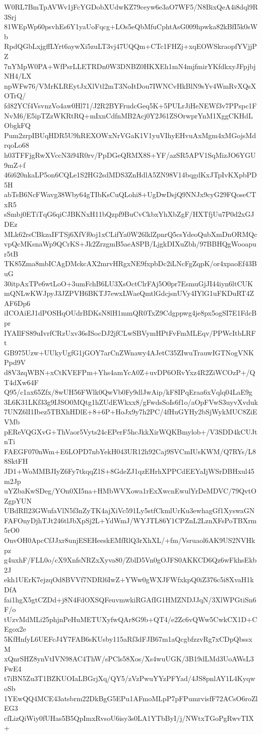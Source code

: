 W0RL7BmTpAVWv1jFcYGDobXUdwKZ79ceyw6e3aO7WF5/N8BixQeA4i8dql9R3Srj
81WEpWp60psvhEs6Y1yaUoFqcg+LOs5eQbMfuCphtAsG009hpwka82kBfI5k0sWb
RpdQGbLxjgffLYrt6aywXi5zuLT3vj47UQQm+CTc1FHZj+xqEOWSkraopfYVjjPZ
7nYMpW0PA+WfPsrLLETRDn0W3DNBZ0HKXEh1mN4mjfmirYKfdkxyJFpjbjNH4/LX
npWFw76/VMrKLREytJxXlVtl2mT3NoItDou7IWNCvHkBlN9sYv4WmRvXQsXOTrQ/
fd82YCf4VsvnzVo4aw0Hl71/J2R2BYFrudcGeq5K+5PULrJiHeNEWf3v7PPspc1F
NvM6/E5ipTZzWKRtRQ+mIxnCdfnMB2Acj0Y2J61ZSOrwprYnM1XggCKHdLObgkFQ
Pum2zrpIBUqHDR5U9hREXOWxNrVGaK1V1yuVIhyEHvuAxMgm4xMGojsMdrqoLo68
h03TFFjgRwXVccN3i94R0rv/PpDGeQRMX8S+YF/azSR5APV1SqMizJO6YGU9mZ+f
46i620nkaLP5on6CQLe1S2HG2sdMDS3ZnHdlA5ZN98V14bqgdKxJTpIvKXpbPD5H
abTsB6NcFWavg38Wby64gTIbKsCuQLohi8+UgDwDsjQ9NNJx9cyG29FQoseCTxR5
sSmbj0ETiTqG6qiCJBKNxH11bQzpf9BuCvCkbxYhXbZgF/HXTfjUu7P0d2xGJDEz
MLk62rsCBkzaIFTSj6XfVf0oj1xCLifYa0W26lklZpnrQ5csYdeoQubXmDnORMQc
vpQcMKsnaWp9QCrKS+Jk2ZrzgmB5aeASPB/LjgkDIXuZbh/97BBHQgWooapur5tB
TK85Zma8mbICAgDMckcAX2mrvHRgxNE9fxpbDc2iLNcFgZqpK/or4xpaoEf43BuG
30itpAxTPe6wtLoO+3umFchB6LU3XsOctClrFAj5O0pr7EsmuGjJI44iyn6ltCUK
mQNLwKWJpyJ3JZPVH6BKTJ7ewxLWaeQmtlGdcjsnUVy4IYlG1uFKDuRT4ZAF6Dp6
iICOAiEJ1dPOSHqOUdrBDKsN8lH1mmQR0TxZ9Cdgppwg4je8px5ogSI7E1FdcBpr
IYAIlFS89uIvrfCRzUxv36sISocDJ2jfCLwSBVymHPtFvFmMLEqv/PPWcItbLRFt
GB975Uzw+UUkyUgfG1jGOY7arCnZWnawy4AJetC35ZIwuTrauwIGTNogVNKPpd9V
d8V3zqWBN+xCtKVEFPm+Yhs4amYcA0Z+uvDP6ORvYxz4R2ZiWCOzP+/QT4dXw64F
Q95/c1ax65Zfx/8wUH56FWlk0QwVb0Fy9dlJwAip/kF8IPqEraa6xVqlq04LaE9g
3L6K31LKf33g9IJSO0MQtg1hZUdEWkxx8/gFwdsSoIs6f1o/aOpFVwS3uyvXvduk
7UNZ6lI1Ibez5TBXhHDlE+8+6P+HoJx9y7h2PC/4fHuGYHy2bSjWykMUC8ZiEVMb
pEReVQGXvG+ThVaor5Vyts24cEPerF5hcJkkXirWQKBmylob+/V3SDD4kCUJtnTi
FAEGF070nWm+E6LOPD7nbYekH043UR12h92Caj9SVCmIUsKWM/Q7RYs/L88SktFH
JD1+WoMMBJIyZ6Fy7tkqqZ1S+8GdeZJ1qzEHrhXPPCdEEYaIjWSrDBHxul45m2Jp
uYZbaKwSDeg/YOn0XI5na+HMbWVXowa1rExXwcnEwulYrDeMDVC/79QvtOZgpYUN
UBdRIl23GWufaVlN5f3nZyTK4ajXiVc591Ly5stfCkmlUrKu3ewhagGf1XyswaGN
FAFOnyDjhTJt246tlJbXpSj2L+YdWmJ/WYJTL86Y1CPZnL2LznXFsPoTBXrm5rO0
OnvOH0ApcCfJJxr8unjESEHeeskEMfRlQ3rXhXL/+fm/Vsruaol6AK9US2NVHkpz
g4uxhF/FLL0o/cX9XnfsNRZxXyva80/ZblD5Vn0gOJFS0AKKCD6Qz6wFkhsEkb2J
ekh1UErK7ejzqOd8BVVf7NDRl6IwZ+YWw0gWXJFWfxkpQ0iZ376c5i8XvaH1kDfA
fai1hgX5gtCZDd+j8N4FdOXSQFeuvmwkiRGAfIG1HMZNDJJqN/3XlWPGtiSn6F/o
tUzvMdMLi25phjnPeHuMETUXyfwQAr8G9b+QT4/e2Zc6vQWw5CwkCX1D+CEgox2e
5KfHnfyL6UEFcJ4Y7FAB6sKUsby115aRf3dFJB67m1aQcgbfzzvRg7xCDpQbssxM
xQnrSHZ8ynVtIVN98AC4ThW/sPCls58Xos/Xs4wuUGK/3B19dLMd3UoAWsL3FwE4
t7iBN5Zu3T1BZKUOIaLBGrjXq/QY5/zVzPwuYYzPFYad/4JS8pnlAY1L4KyqwoSb
1YEwQQ4MCE43atsbrm22DkBgG5EPu1AFmoMLpP7pFPumrvisfF72ACsO6roZlEG3
cfLizQiWiy0fUHas5B5QpImxRvsoU6isy3s0LA1YTbByI/j/NWtxTGoPgRwvTIX+
